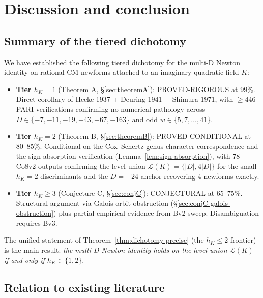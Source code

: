 \documentclass[11pt,a4paper]{amsart}
\theoremstyle{definition}
\newcommand{\Lcal}{\mathcal{L}}
\newcommand{\hK}{h_{K}}
\begin{document}
\section{Discussion and conclusion}\label{sec:conclusion}

\subsection{Summary of the tiered dichotomy}\label{sec:conclusion-summary}

We have established the following tiered dichotomy for the multi-D Newton identity on rational CM newforms attached to an imaginary quadratic field $K$:

\begin{itemize}[leftmargin=2em]
  \item \textbf{Tier $\hK = 1$} (Theorem A, \S\ref{sec:theoremA}): PROVED-RIGOROUS at 99\%. Direct corollary of Hecke 1937 + Deuring 1941 + Shimura 1971, with $\ge 446$ PARI verifications confirming no numerical pathology across $D \in \{-7, -11, -19, -43, -67, -163\}$ and odd $w \in \{5, 7, \ldots, 41\}$.
  \item \textbf{Tier $\hK = 2$} (Theorem B, \S\ref{sec:theoremB}): PROVED-CONDITIONAL at 80--85\%. Conditional on the Cox--Schertz genus-character correspondence and the sign-absorption verification (Lemma~\ref{lem:sign-absorption}), with $78+$ Co8v2 outputs confirming the level-union $\Lcal(K) = \{|D|, 4|D|\}$ for the small $\hK = 2$ discriminants and the $D = -24$ anchor recovering 4 newforms exactly.
  \item \textbf{Tier $\hK \ge 3$} (Conjecture C, \S\ref{sec:conjC}): CONJECTURAL at 65--75\%. Structural argument via Galois-orbit obstruction (\S\ref{sec:conjC-galois-obstruction}) plus partial empirical evidence from Bv2 sweep. Disambiguation requires Bv3.
\end{itemize}

The unified statement of Theorem~\ref{thm:dichotomy-precise} (the $\hK \le 2$ frontier) is the main result: \emph{the multi-D Newton identity holds on the level-union $\Lcal(K)$ if and only if $\hK \in \{1, 2\}$}.

\subsection{Relation to existing literature}\label{sec:conclusion-lit}
\end{document}
